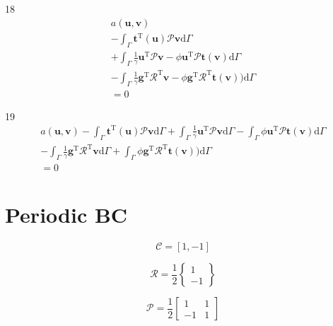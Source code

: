 \documentclass[a4paper,12pt]{article}
\begin{document}
18
\begin{equation}
\begin{split}
a(\mathbf{u},\mathbf{v})
\\-
\int_\Gamma
\mathbf{t}^\textrm{T}(\mathbf{u})\mathcal{P}\mathbf{v}
\textrm{d}\Gamma
\\+
\int_\Gamma
\frac{1}{\gamma}
\mathbf{u}^\textrm{T}\mathcal{P}\mathbf{v}
-
\phi\mathbf{u}^\textrm{T}\mathcal{P}\mathbf{t}(\mathbf{v})
\textrm{d}\Gamma
\\-
\int_\Gamma
\frac{1}{\gamma}
\mathbf{g}^\textrm{T}\mathcal{R}^\textrm{T}
\mathbf{v}
-
\phi\mathbf{g}^\textrm{T}\mathcal{R}^\textrm{T}\mathbf{t}(\mathbf{v}))
\textrm{d}\Gamma
\\=
0
\end{split}
\end{equation}

19
\begin{equation}
\begin{split}
a(\mathbf{u},\mathbf{v})
-
\int_\Gamma
\mathbf{t}^\textrm{T}(\mathbf{u})\mathcal{P}\mathbf{v}
\textrm{d}\Gamma
+
\int_\Gamma
\frac{1}{\gamma}
\mathbf{u}^\textrm{T}\mathcal{P}\mathbf{v}
\textrm{d}\Gamma
-
\int_\Gamma
\phi\mathbf{u}^\textrm{T}\mathcal{P}\mathbf{t}(\mathbf{v})
\textrm{d}\Gamma
\\-
\int_\Gamma
\frac{1}{\gamma}
\mathbf{g}^\textrm{T}\mathcal{R}^\textrm{T}
\mathbf{v}
\textrm{d}\Gamma
+
\int_\Gamma
\phi\mathbf{g}^\textrm{T}\mathcal{R}^\textrm{T}\mathbf{t}(\mathbf{v}))
\textrm{d}\Gamma
\\=
0
\end{split}
\end{equation}

\section{Periodic BC}

\begin{equation}
\mathcal{C} = [1,-1]
\end{equation}

\begin{equation}
\mathcal{R} = \frac{1}{2}
\left\{
\begin{array}{c}
1\\
-1
\end{array}
\right\}
\end{equation}

\begin{equation}
\mathcal{P} = \frac{1}{2}
\left[
\begin{array}{cc}
1 & 1\\
-1 & 1
\end{array}
\right]
\end{equation}
\end{document}

